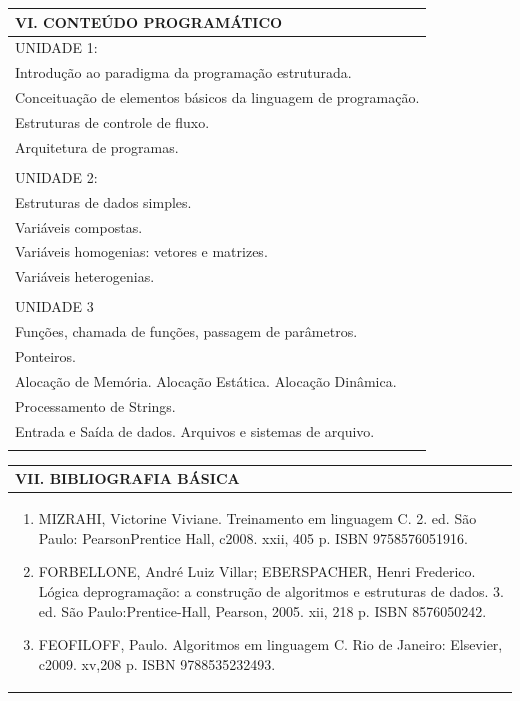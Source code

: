 \documentclass[12pt]{article}
\begin{document}
\begin{longtable}{|L{1.025\textwidth}|} \hline
%
{\bf VI. CONTEÚDO PROGRAMÁTICO } \\ \hline

UNIDADE 1: \\
Introdução ao paradigma da programação estruturada. \\
Conceituação de elementos básicos da linguagem de programação. \\
Estruturas de controle de fluxo. \\
Arquitetura de programas. \\
\\

UNIDADE 2: \\
Estruturas de dados simples. \\
Variáveis compostas. \\
Variáveis homogenias: vetores e matrizes. \\
Variáveis heterogenias. \\
\\

UNIDADE 3 \\
Funções, chamada de funções, passagem de parâmetros. \\
Ponteiros. \\
Alocação de Memória. Alocação Estática. Alocação Dinâmica. \\
Processamento de Strings. \\
Entrada e Saída de dados. Arquivos e sistemas de arquivo.\\

\\ \hline
\end{longtable} 





\begin{longtable}{|L{1.025\textwidth}|} \hline
%
{\bf VII. BIBLIOGRAFIA BÁSICA} \\ \hline
\begin{enumerate}
%
\item MIZRAHI, Victorine Viviane. Treinamento em linguagem C. 2. ed. São Paulo: PearsonPrentice Hall, c2008. xxii, 405 p. ISBN 9758576051916.
\item FORBELLONE, André Luiz Villar; EBERSPACHER, Henri Frederico. Lógica deprogramação: a construção de algoritmos e estruturas de dados. 3. ed. São Paulo:Prentice-Hall, Pearson, 2005. xii, 218 p. ISBN 8576050242. 
\item FEOFILOFF, Paulo. Algoritmos em linguagem C. Rio de Janeiro: Elsevier, c2009. xv,208 p. ISBN 9788535232493.

%

\end{enumerate}
 \\ \hline
\end{longtable}
\end{document}
